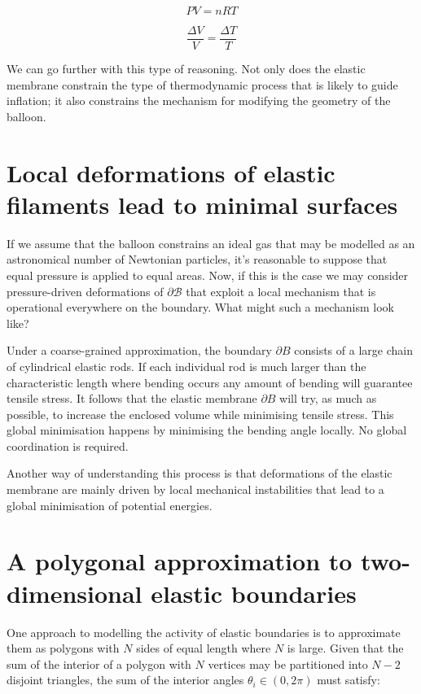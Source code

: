 \documentclass{article}
\begin{document}
\begin{equation}
PV = nRT
\end{equation}

\begin{equation}
\frac{\Delta V}{V} = \frac{\Delta T}{T}
\end{equation}

We can go further with this type of reasoning. Not only does the elastic membrane constrain the type of thermodynamic process that is likely to guide
inflation; it also constrains the mechanism for modifying the geometry of the balloon.

\newpage

\section{Local deformations of elastic filaments lead to minimal surfaces}

If we assume that the balloon constrains an ideal gas that may be modelled as an astronomical number of Newtonian particles, it's reasonable to suppose
that equal pressure is applied to equal areas. Now, if this is the case we may consider pressure-driven deformations of $\partial \mathcal{B}$ that
exploit a local mechanism that is operational everywhere on the boundary. What might such a mechanism look like?

Under a coarse-grained approximation, the boundary $\partial B$ consists of a large chain of cylindrical elastic rods. If each individual rod is much larger
than the characteristic length where bending occurs any amount of bending will guarantee tensile stress. It follows that the elastic membrane $\partial B$ will try, as much as possible, to increase the enclosed volume while minimising tensile stress.
This global minimisation happens by minimising the bending angle locally. No global coordination is required.

Another way of understanding this process is that deformations of the elastic membrane are mainly driven by local mechanical instabilities that lead to
a global minimisation of potential energies.

\section{A polygonal approximation to two-dimensional elastic boundaries}

One approach to modelling the activity of elastic boundaries is to approximate them as polygons with $N$ sides of equal length where $N$ is large.
Given that the sum of the interior of a polygon with $N$ vertices may be partitioned into $N-2$ disjoint triangles, the sum of the interior angles $\theta_i \in (0,2\pi)$ must satisfy:
\end{document}
